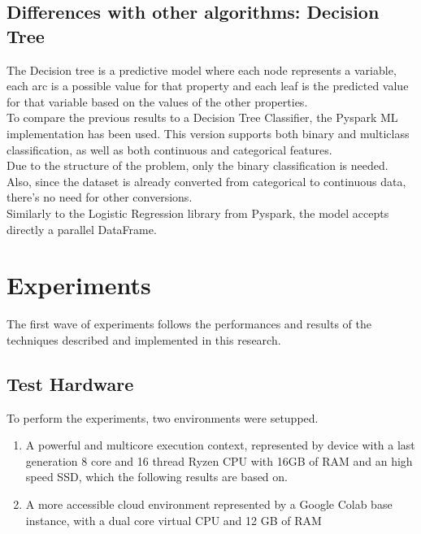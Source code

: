 \documentclass[
	letterpaper, %
	10pt, %
]{class}
\begin{document}
\subsection{Differences with other algorithms: Decision Tree}
The Decision tree is a predictive model where each node represents a variable, each arc is a possible value for that property and each leaf is the predicted value for that variable based on the values of the other properties.\\
To compare the previous results to a Decision Tree Classifier, the Pyspark ML implementation has been used. This version supports both binary and multiclass classification, as well as both continuous and categorical features.\\
Due to the structure of the problem, only the binary classification is needed. Also, since the dataset is already converted from categorical to continuous data, there's no need for other conversions.\\
Similarly to the Logistic Regression library from Pyspark, the model accepts directly a parallel DataFrame.


\section{Experiments}

The first wave of experiments follows the performances and results of the techniques described and implemented in this research.

\subsection{Test Hardware}

To perform the experiments, two environments were setupped.
\begin{enumerate}
    \item A powerful and multicore execution context, represented by device with a last generation 8 core and 16 thread Ryzen CPU with 16GB of RAM and an high speed SSD, which the following results are based on.
    \item A more accessible cloud environment represented by a Google Colab base instance, with a dual core virtual CPU and 12 GB of RAM
\end{enumerate}
\end{document}
